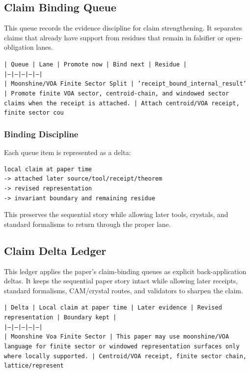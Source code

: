 \documentclass[11pt]{article}
\begin{document}
\subsection*{Claim Binding Queue}

This queue records the evidence discipline for claim strengthening. It separates claims that already have support from residues that remain in falsifier or open-obligation lanes.

\noindent\texttt{| Queue | Lane | Promote now | Bind next | Residue |}\\
\noindent\texttt{|---|---|---|---|---|}\\
\noindent\texttt{| Moonshine/VOA Finite Sector Split | `receipt\_bound\_internal\_result` | Promote finite VOA sector, centroid-chain, and windowed sector claims when the receipt is attached. | Attach centroid/VOA receipt, finite sector cou}\\

\subsubsection*{Binding Discipline}

Each queue item is represented as a delta:

\begin{verbatim}
local claim at paper time
-> attached later source/tool/receipt/theorem
-> revised representation
-> invariant boundary and remaining residue
\end{verbatim}

This preserves the sequential story while allowing later tools, crystals, and
standard formalisms to return through the proper lane.

\subsection*{Claim Delta Ledger}

This ledger applies the paper's claim-binding queues as explicit back-application
deltas. It keeps the sequential paper story intact while allowing later
receipts, standard formalisms, CAM/crystal routes, and validators to sharpen the
claim.

\noindent\texttt{| Delta | Local claim at paper time | Later evidence | Revised representation | Boundary kept |}\\
\noindent\texttt{|---|---|---|---|---|}\\
\noindent\texttt{| Moonshine Voa Finite Sector | This paper may use moonshine/VOA language for finite sector or windowed representation surfaces only where locally supported. | Centroid/VOA receipt, finite sector chain, lattice/represent}\\
\end{document}
